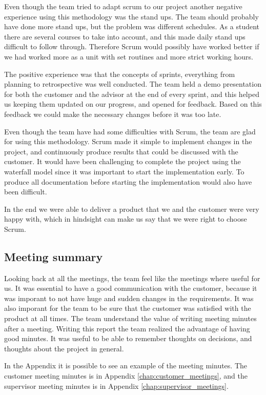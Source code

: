 Even though the team tried to adapt scrum to our project another negative experience using this methodology was the stand ups. The team should probably have done more stand ups, but the problem was different schedules. As a student there are several courses to take into account, and this made daily stand ups difficult to follow through. Therefore Scrum would possibly have worked better if we had worked more as a unit with set routines and more strict working hours.

The positive experience was that the concepts of sprints, everything from planning to retrospective was well conducted. The team held a demo presentation for both the customer and the advisor at the end of every sprint, and this helped us keeping them updated on our progress, and opened for feedback. Based on this feedback we could make the necessary changes before it was too late.

Even though the team have had some difficulties with Scrum, the team are glad for using this methodology. Scrum made it simple to implement changes in the project, and continuously produce results that could  be discussed with the customer. It would have been challenging to complete the project using the waterfall model since it was important to start the implementation early. To produce all documentation before starting the implementation would also have been difficult. 

In the end we were able to deliver a product that we and the customer were very happy with, which in hindsight can make us say that we were right to choose Scrum.

\subsection{Meeting summary}
Looking back at all the meetings, the team feel like the meetings where useful for us. It was essential to have a good communication with the customer, because it was imporant to not have huge and sudden changes in the requirements. It was also imporant for the team to be sure that the customer was satisfied with the product at all times. The team understand the value of writing meeting minutes after a meeting. Writing this report the team realized the advantage of having good minutes. It was useful to be able to remember thoughts on decisions, and thoughts about the project in general.

In the Appendix it is possible to see an example of the meeting minutes. The customer meeting minutes is in Appendix \ref{chap:customer_meetings}, and the supervisor meeting minutes is in Appendix \ref{chap:supervisor_meetings}. 
